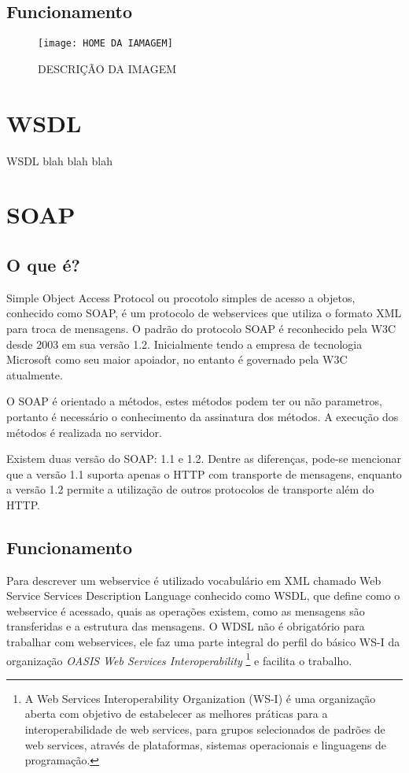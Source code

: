 \documentclass{acm_proc_article-sp}
\begin{document}
	\subsection{Funcionamento}
		
\begin{figure}[h]
			\begin{center}
				 \texttt{[image: HOME DA IAMAGEM]}
				 \caption{DESCRIÇÃO DA IMAGEM}
				 \label{fig:AQUI O NOME DA IMAGEM}
			\end{center}
		\end{figure}
		
\section{WSDL}
	
		WSDL blah blah blah
	
\section{SOAP}

	\subsection{O que é?}
	
		Simple Object Access Protocol ou procotolo simples de acesso a objetos, conhecido como SOAP, é um protocolo de webservices que utiliza o formato XML para troca de mensagens. O padrão do protocolo SOAP é reconhecido pela W3C desde 2003 em sua versão 1.2. Inicialmente tendo a empresa de tecnologia Microsoft como seu maior apoiador, no entanto é governado pela W3C atualmente.
		
		O SOAP é orientado a métodos, estes métodos podem ter ou não parametros, portanto é necessário o conhecimento da assinatura dos métodos. A execução dos métodos é realizada no servidor.
		
		Existem duas versão do SOAP: 1.1 e 1.2. Dentre as diferenças, pode-se mencionar que a versão 1.1 suporta apenas o HTTP com transporte de mensagens, enquanto a versão 1.2 permite a utilização de outros protocolos de transporte além do HTTP. \cite{WEBSERVICESZEND}
		
	\subsection{Funcionamento}
	
		Para descrever um webservice é utilizado vocabulário em XML chamado Web Service Services Description Language conhecido como WSDL, que define como o webservice é acessado, quais as operações existem, como as mensagens são transferidas e a estrutura das mensagens. O WDSL não é obrigatório para trabalhar com webservices, ele faz uma parte integral do perfil do básico WS-I da organização \emph{OASIS Web Services Interoperability} \footnote{A Web Services Interoperability Organization (WS-I) é uma organização aberta com objetivo de estabelecer as melhores práticas para a interoperabilidade de web services, para grupos selecionados de padrões de web services, através de plataformas, sistemas operacionais e linguagens de programação.\cite{OASIS-WS-I-SITE}} e facilita o trabalho. 
		
\end{document}
